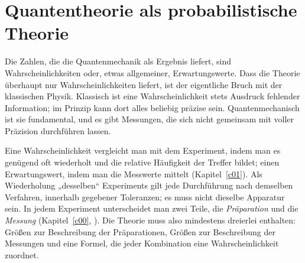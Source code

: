 %

\chapter{Quantentheorie als probabilistische Theorie}\label{c04}

Die Zahlen, die die Quantenmechanik als Ergebnis liefert, sind Wahrscheinlichkeiten oder,
etwas allgemeiner, Erwartungswerte. Dass die Theorie überhaupt nur Wahrscheinlichkeiten liefert,
ist der eigentliche Bruch mit der klassischen Physik. Klassisch ist eine Wahrscheinlichkeit stets
Ausdruck fehlender Information; im Prinzip kann dort alles beliebig präzise sein.
Quantenmechanisch ist sie fundamental, und es gibt Messungen, die sich nicht gemeinsam mit voller
Präzision durchführen lassen.

Eine Wahrscheinlichkeit vergleicht man mit dem Experiment, indem man es genügend oft wiederholt
und die relative Häufigkeit der Treffer bildet; einen Erwartungswert, indem man die Messwerte
mittelt (Kapitel~\ref{c01}). Als Wiederholung „desselben“ Experiments gilt jede Durchführung nach
demselben Verfahren, innerhalb gegebener Toleranzen; es muss nicht dieselbe Apparatur sein. In
jedem Experiment unterscheidet man zwei Teile, die \emph{Präparation} und die \emph{Messung}
(Kapitel~\ref{c00}, ). Die Theorie muss also mindestens dreierlei enthalten: Größen zur
Beschreibung der Präparationen, Größen zur Beschreibung der Messungen und eine Formel, die jeder
Kombination eine Wahrscheinlichkeit zuordnet.

